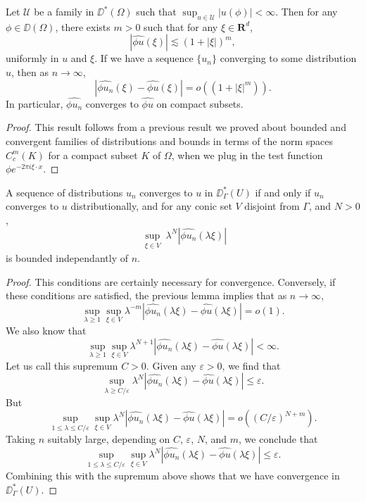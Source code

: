\begin{lemma}
    Let $\mathcal{U}$ be a family in $\DD^*(\Omega)$ such that $\sup_{u \in \mathcal{U}} |u(\phi)| < \infty$. Then for any $\phi \in \DD(\Omega)$, there exists $m > 0$ such that for any $\xi \in \mathbf{R}^d$,
    \[ |\widehat{\phi u}(\xi)| \lesssim (1 + |\xi|)^m, \]
    uniformly in $u$ and $\xi$. If we have a sequence $\{ u_n \}$ converging to some distribution $u$, then as $n \to \infty$,
    \[ |\widehat{\phi u_n}(\xi) - \widehat{\phi u}(\xi)| = o((1 + |\xi|^m)). \]
    In particular, $\widehat{\phi u_n}$ converges to $\widehat{\phi u}$ on compact subsets.
\end{lemma}
\begin{proof}
    This result follows from a previous result we proved about bounded and convergent families of distributions and bounds in terms of the norm spaces $C^m_c(K)$ for a compact subset $K$ of $\Omega$, when we plug in the test function $\phi e^{-2 \pi i \xi \cdot x}$.
\end{proof}

\begin{theorem}
    A sequence of distributions $u_n$ converges to $u$ in $\DD^*_\Gamma(U)$ if and only if $u_n$ converges to $u$ distributionally, and for any conic set $V$ disjoint from $\Gamma$, and $N > 0$,
    \[ \sup_{\substack{\xi \in V}} \lambda^N |\widehat{\phi u_n}(\lambda \xi)| \]
    is bounded independantly of $n$.
\end{theorem}
\begin{proof}
    This conditions are certainly necessary for convergence. Conversely, if these conditions are satisfied, the previous lemma implies that as $n \to \infty$,
    \[ \sup_{\lambda \geq 1} \sup_{\xi \in V} \lambda^{-m} |\widehat{\phi u_n}(\lambda \xi) - \widehat{\phi u}(\lambda \xi)| = o(1). \]
    We also know that
    \[ \sup_{\lambda \geq 1} \sup_{\xi \in V} \lambda^{N+1} |\widehat{\phi u_n}(\lambda \xi) - \widehat{\phi u}(\lambda \xi)| < \infty. \]
    Let us call this supremum $C > 0$. Given any $\varepsilon > 0$, we find that
    \[ \sup_{\lambda \geq C/\varepsilon} \lambda^N |\widehat{\phi u_n}(\lambda \xi) - \widehat{\phi u}(\lambda \xi)| \leq \varepsilon. \]
    But
    \[ \sup_{1 \leq \lambda \leq C/\varepsilon} \sup_{\xi \in V} \lambda^N |\widehat{\phi u_n}(\lambda \xi) - \widehat{\phi u}(\lambda \xi)| = o((C/\varepsilon)^{N+m}). \]
    Taking $n$ suitably large, depending on $C$, $\varepsilon$, $N$, and $m$, we conclude that
    \[ \sup_{1 \leq \lambda \leq C/\varepsilon} \sup_{\xi \in V} \lambda^N |\widehat{\phi u_n}(\lambda \xi) - \widehat{\phi u}(\lambda \xi)| \leq \varepsilon. \]
    Combining this with the supremum above shows that we have convergence in $\DD^*_\Gamma(U)$.
\end{proof}

